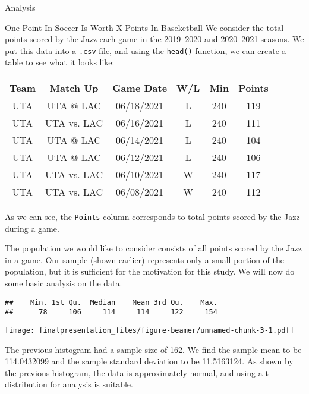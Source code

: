 \documentclass[
  ignorenonframetext,
]{beamer}
\begin{document}
\begin{frame}[fragile]{Analysis}
\protect\hypertarget{analysis}{}
\begin{block}{One Point In Soccer Is Worth X Points In Baseketball}
\protect\hypertarget{one-point-in-soccer-is-worth-x-points-in-baseketball}{}
We consider the total points scored by the Jazz each game in the
2019--2020 and 2020--2021 seasons. We put this data into a \texttt{.csv}
file, and using the \texttt{head()} function, we can create a table to
see what it looks like:

\begin{table}
\centering
\begin{tabular}{c|c|c|c|c|c}
\hline
Team & Match Up & Game Date & W/L & Min & Points\\
\hline
UTA & UTA @ LAC & 06/18/2021 & L & 240 & 119\\
\hline
UTA & UTA vs. LAC & 06/16/2021 & L & 240 & 111\\
\hline
UTA & UTA @ LAC & 06/14/2021 & L & 240 & 104\\
\hline
UTA & UTA @ LAC & 06/12/2021 & L & 240 & 106\\
\hline
UTA & UTA vs. LAC & 06/10/2021 & W & 240 & 117\\
\hline
UTA & UTA vs. LAC & 06/08/2021 & W & 240 & 112\\
\hline
\end{tabular}
\end{table}

As we can see, the \texttt{Points} column corresponds to total points
scored by the Jazz during a game.

The population we would like to consider consists of all points scored
by the Jazz in a game. Our sample (shown earlier) represents only a
small portion of the population, but it is sufficient for the motivation
for this study. We will now do some basic analysis on the data.

\begin{verbatim}
##    Min. 1st Qu.  Median    Mean 3rd Qu.    Max. 
##      78     106     114     114     122     154
\end{verbatim}

\texttt{[image: finalpresentation\_files/figure-beamer/unnamed-chunk-3-1.pdf]}

The previous histogram had a sample size of 162. We find the sample mean
to be 114.0432099 and the sample standard deviation to be 11.5163124. As
shown by the previous histogram, the data is approximately normal, and
using a t-distribution for analysis is suitable.


\end{block}
\end{frame}
\end{document}
